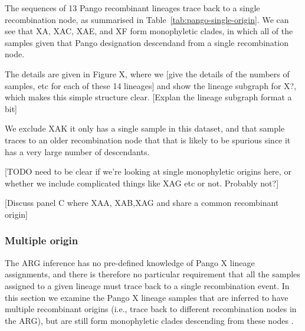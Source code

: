 \documentclass{article}
\begin{document}
The sequences of 13 Pango recombinant lineages trace back to a single recombination
node, as summarised in Table~\ref{tab:pango-single-origin}. We can
see that XA, XAC, XAE, and XF form monophyletic clades, in which all of the
samples given that Pango designation descendand from a single recombination
node.

The details are given in Figure X, where we [give the details of
the numbers of samples, etc for each of these 14 lineages] and
show the lineage subgraph for X?, which makes this simple structure
clear. [Explan the lineage subgraph format a bit]



We exclude XAK it only has a single sample in this dataset, and
that sample traces to an older recombination node that
that is likely to be spurious since it has a very large number of descendants.


[TODO need to be clear if we're looking at single monophyletic origins
here, or whether we include complicated things like XAG etc or not.
Probably not?]


[Discuss panel C where XAA, XAB,XAG and share a common recombinant origin]

\subsubsection{Multiple origin}
The ARG inference has no pre-defined knowledge of Pango X lineage assignments,
and there is therefore no particular requirement that all the samples
assigned to a given lineage must trace back to a single recombination
event. In this section we examine the Pango X lineage samples that
are inferred to have multiple recombinant origins (i.e., trace
back to different recombination nodes in the ARG), but are still
form monophyletic clades %
descending from these nodes .
\end{document}

